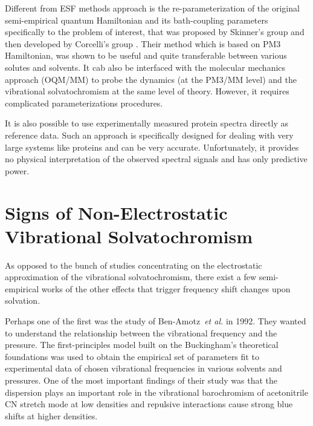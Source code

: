 \documentclass[b5paper,oneside,fleqn,11pt]{book}
\begin{document}
\begin{refsection}
Different from ESF methods approach is the re\hyp{}parameterization of the original semi\hyp{}empirical 
quantum Hamiltonian and its bath\hyp{}coupling parameters specifically to the problem of interest,
that was proposed by Skinner's group \citep{Li.Schmidt.Corcelli.Lawrence.Skinner.JCP.2006}
and then developed by Corcelli's group \citep{
Lindquist.Corcelli.JPCB.2008,Lindquist.Haws.Corcelli.JPCB.2008,
Lindquist.Furse.Corcelli.PCCP.2009}. Their method which is based on PM3 Hamiltonian, \citep{Stewart.JCC.1988}
was shown to be useful and quite transferable between various solutes and solvents. 
It cab also be interfaced with the molecular mechanics approach (OQM/MM) \citep{Lindquist.Haws.Corcelli.JPCB.2008}
to probe the dynamics (at the PM3/MM level) and the vibrational solvatochromism 
at the same level of theory.
However, it requires complicated
parameterizations procedures.

It is also possible to use experimentally measured protein spectra directly 
as reference data. \citep{Karjalainen.Ersmark.Barth.JPCB.2012}
Such an approach is specifically designed for dealing with very large systems like proteins and
can be very accurate. Unfortunately, it provides no physical interpretation of the observed
spectral signals and has only predictive power.



\section{Signs of Non-Electrostatic Vibrational Solvatochromism\label{s:signs-non-elect-solv}}
As opposed to the bunch of studies concentrating on the electrostatic
approximation of the vibrational solvatochromism, there exist a few 
semi\hyp{}empirical works of the other effects that trigger frequency shift
changes upon solvation. 

Perhaps one of the first was the study of Ben-Amotz~\emph{et al.} in 1992. \citep{Ben-Amotz.Lee.Cho.List.JCP.1992}
They wanted to understand the relationship between the vibrational frequency
and the pressure. The first\hyp{}principles model built on the Buckingham's theoretical
foundations \citep{Buckingham.ProcRSocLondonA.1958,Buckingham.TransFaradaySoc.1960,
Buckingham.ProcRSocLondonA.1960} was used to obtain the empirical set of parameters fit to
experimental data of chosen vibrational frequencies in various solvents
and pressures. One of the most important findings of their study was
that the dispersion plays an important role in the vibrational barochromism
of acetonitrile CN stretch mode at low densities and repulsive interactions cause strong blue shifts
at higher densities.


\end{refsection}
\end{document}
